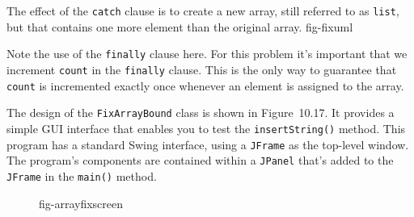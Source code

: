 \noindent The effect of the {\tt catch} clause is to create a new
array, still referred to as {\tt list}, but that contains one more
element than the original array.
{fig-fixuml}


Note the use of the {\tt finally} clause here.  For this problem it's
important that we increment {\tt count} in the {\tt finally}
clause.  This is the only way to guarantee that {\tt count} is
incremented exactly once whenever an element is assigned to the array.


The design of the {\tt FixArrayBound} class is shown in
Figure~10.17. It provides a simple GUI interface that enables you to
test the {\tt insertString()} method. This program has a standard
Swing interface, using a {\tt JFrame} as the top-level window.  The
program's components are contained within a {\tt JPanel} that's added
to the {\tt JFrame} in the {\tt main()} method.

\begin{figure}[b]
{fig-arrayfixscreen}
\end{figure}

